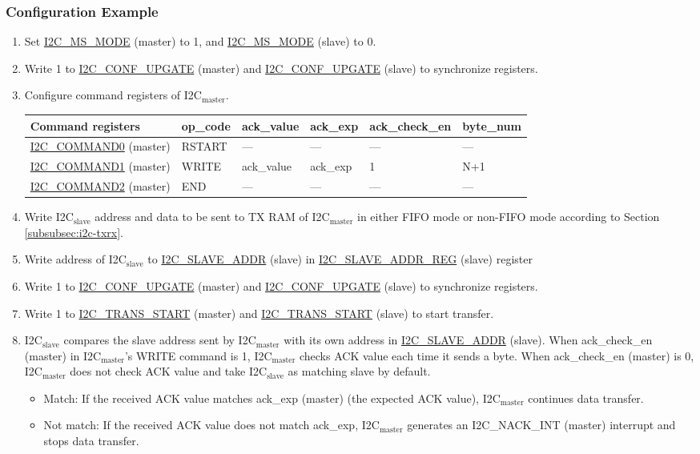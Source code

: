 \documentclass[main\_\_EN.tex]{subfiles}
\begin{document}
\subsubsection{Configuration Example}
\begin{enumerate}
\item Set \hyperref[fielddesc:I2CMSMODE]{I2C\_MS\_MODE} (master) to 1, and \hyperref[fielddesc:I2CMSMODE]{I2C\_MS\_MODE} (slave) to 0.
\item Write 1 to \hyperref[fielddesc:I2CCONFUPGATE]{I2C\_CONF\_UPGATE} (master) and \hyperref[fielddesc:I2CCONFUPGATE]{I2C\_CONF\_UPGATE} (slave) to synchronize registers.
\item Configure command registers of I2C$_\text{master}$.
\begin{longtable}{ | p{4cm} | p{2cm} | p{2cm} | p{2cm} |p{2cm} | p{2cm} |}
\hline\rowcolor{lightgray}
Command registers& op\_code & ack\_value&ack\_exp&ack\_check\_en&byte\_num  \\ \hline
\hyperref[fielddesc:I2CCOMMAND0]{I2C\_COMMAND0} (master)& RSTART& ---&---&---&---  \\ \hline
\hyperref[fielddesc:I2CCOMMAND1]{I2C\_COMMAND1} (master)& WRITE& ack\_value&ack\_exp&1&N+1  \\ \hline
\hyperref[fielddesc:I2CCOMMAND2]{I2C\_COMMAND2} (master)& END& ---&---&---&---  \\ \hline
\end{longtable}
\item Write I2C$_\text{slave}$ address and data to be sent to TX RAM of I2C$_\text{master}$ in either FIFO mode or non-FIFO mode according to Section \ref{subsubsec:i2c-txrx}.
\item Write address of I2C$_\text{slave}$ to \hyperref[fielddesc:I2CSLAVEADDR]{I2C\_SLAVE\_ADDR} (slave) in \hyperref[regdesc:I2CSLAVEADDRREG]{I2C\_SLAVE\_ADDR\_REG} (slave) register
\item Write 1 to \hyperref[fielddesc:I2CCONFUPGATE]{I2C\_CONF\_UPGATE} (master) and \hyperref[fielddesc:I2CCONFUPGATE]{I2C\_CONF\_UPGATE} (slave) to synchronize registers.
\item Write 1 to \hyperref[fielddesc:I2CTRANSSTART]{I2C\_TRANS\_START} (master) and \hyperref[fielddesc:I2CTRANSSTART]{I2C\_TRANS\_START} (slave) to start transfer.
\item I2C$_\text{slave}$ compares the slave address sent by I2C$_\text{master}$ with its own address in \hyperref[fielddesc:I2CSLAVEADDR]{I2C\_SLAVE\_ADDR} (slave). When ack\_check\_en (master) in I2C$_\text{master}$'s WRITE command is 1, I2C$_\text{master}$ checks ACK value each time it sends a byte. When ack\_check\_en (master) is 0, I2C$_\text{master}$ does not check ACK value and take I2C$_\text{slave}$ as matching slave by default.
\begin{itemize}
\item Match: If the received ACK value matches ack\_exp (master) (the expected ACK value), I2C$_\text{master}$ continues data transfer.
\item Not match: If the received ACK value does not match ack\_exp, I2C$_\text{master}$ generates an I2C\_NACK\_INT (master) interrupt and stops data transfer.
\end{itemize}


\end{enumerate}
\end{document}
